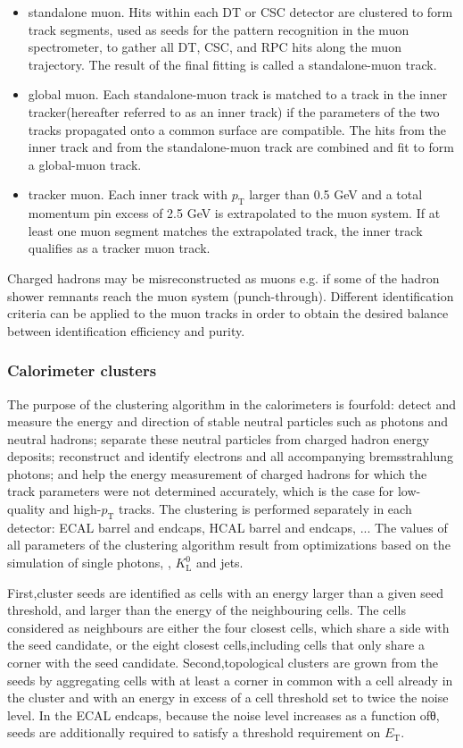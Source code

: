  \begin{itemize}
     \item standalone muon.  Hits within each DT or CSC detector are clustered to form track segments,  used as seeds for the pattern recognition in the muon spectrometer,  to gather all DT, CSC, and RPC hits along the muon trajectory.  The result of the final fitting is called a standalone-muon track.
     \item global muon.  Each standalone-muon track is matched to a track in the inner tracker(hereafter referred to as an inner track) if the parameters of the two tracks propagated onto a common surface are compatible.  The hits from the inner track and from the standalone-muon track are combined and fit to form a global-muon track.
     \item tracker muon. Each inner track with $p_{\mathrm{T}}$ larger than 0.5 GeV and a total momentum pin excess of 2.5 GeV is extrapolated to the muon system. If at least one muon segment matches the extrapolated track, the inner track qualifies as a tracker muon track.
 \end{itemize}
 
 Charged hadrons may be misreconstructed as muons e.g. if some of the hadron shower remnants reach the muon system (punch-through).  Different identification criteria can be applied to the muon tracks in order to obtain the desired balance between identification efficiency and purity. 

\subsubsection{Calorimeter clusters}

The purpose of the clustering algorithm in the calorimeters is fourfold: detect and measure the energy and direction of stable neutral particles such as photons and neutral hadrons; separate these neutral particles from charged hadron energy deposits; reconstruct and identify electrons and all accompanying bremsstrahlung photons; and help the energy measurement of charged hadrons for which the track parameters were not determined accurately, which is the case for low-quality and high-$p_{\mathrm{T}}$ tracks. The clustering is performed separately in each detector: ECAL barrel and endcaps, HCAL barrel and endcaps, ... The values of all parameters of the clustering algorithm result from optimizations based on the simulation of single photons, \pizero, $K^0_{\mathrm{L}}$ and jets.

First,cluster seeds are identified as cells with an energy larger than a given seed threshold, and larger than the energy of the neighbouring cells. The cells considered as neighbours are either the  four  closest  cells,  which  share  a  side  with  the  seed  candidate,  or  the  eight  closest  cells,including cells that only share a corner with the seed candidate. Second,topological clusters are grown from the seeds by aggregating cells with at least a corner in common with a cell already in the cluster and with an energy in excess of a cell threshold set to twice the noise level. In the ECAL endcaps, because the noise level increases as a function ofθ, seeds are additionally required to satisfy a threshold requirement on $E_{\mathrm{T}}$.


